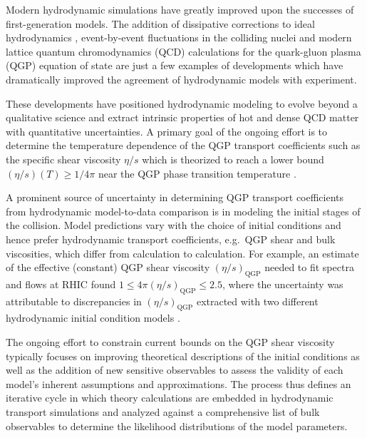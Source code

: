 \documentclass[aps,prc,reprint,amsmath,nofootinbib,superscriptaddress]{revtex4-1}
\begin{document}
Modern hydrodynamic simulations have greatly improved upon the successes of first-generation models.
The addition of dissipative corrections to ideal hydrodynamics \cite{Muronga:2004sf, Chaudhuri:2006jd, Romatschke:2007mq, Dusling:2007gi, Song:2007ux, Luzum:2008cw}, event-by-event fluctuations in the colliding nuclei \cite{Alver:2008zza, Alver:2010gr} and modern lattice quantum chromodynamics (QCD) calculations for the quark-gluon plasma (QGP) equation of state \cite{Bazavov:2009zn, Borsanyi:2013bia, Bazavov:2014pvz} are just a few examples of developments which have dramatically improved the agreement of hydrodynamic models with experiment.

These developments have positioned hydrodynamic modeling to evolve beyond a qualitative science and extract intrinsic properties of hot and dense QCD matter with quantitative uncertainties.
A primary goal of the ongoing effort is to determine the temperature dependence of the QGP transport coefficients such as the specific shear viscosity $\eta/s$ which is theorized to reach a lower bound ${(\eta/s)(T) \ge 1/4\pi}$ near the QGP phase transition temperature \cite{Policastro:2001yc, Kovtun:2004de}.

A prominent source of uncertainty in determining QGP transport coefficients from hydrodynamic model-to-data comparison is in modeling the initial stages of the collision.
Model predictions vary with the choice of initial conditions and hence prefer hydrodynamic transport coefficients, e.g.\ QGP shear and bulk viscosities, which differ from calculation to calculation.
For example, an estimate of the effective (constant) QGP shear viscosity $(\eta/s)_\text{QGP}$ needed to fit spectra and flows at RHIC found ${1 \le 4 \pi(\eta/s)_\text{QGP} \le 2.5}$, where the uncertainty was attributable to discrepancies in $(\eta/s)_\text{QGP}$ extracted with two different hydrodynamic initial condition models \cite{Song:2010mg}.

The ongoing effort to constrain current bounds on the QGP shear viscosity typically focuses on improving theoretical descriptions of the initial conditions \cite{Schenke:2012wb, Niemi:2015qia} as well as the addition of new sensitive observables to assess the validity of each model's inherent assumptions and approximations.
The process thus defines an iterative cycle in which theory calculations are embedded in hydrodynamic transport simulations and analyzed against a comprehensive list of bulk observables to determine the likelihood distributions of the model parameters.
\end{document}
